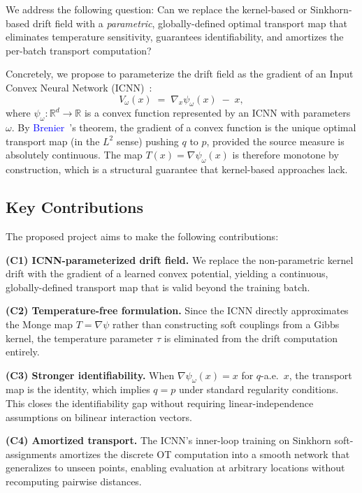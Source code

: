 \documentclass[10pt,conference,compsocconf]{IEEEtran}
\newcommand{\citet}[2]{\textcolor{blue}{#1}~\cite{#2}}
\newcommand{\R}{\mathbb{R}}
\begin{document}
We address the following question: Can we replace the kernel-based or Sinkhorn-based drift field with a \emph{parametric}, globally-defined optimal transport map that eliminates temperature sensitivity, guarantees identifiability, and amortizes the per-batch transport computation? 

Concretely, we propose to parameterize the drift field as the gradient of an Input Convex Neural Network (ICNN)~\cite{amos2017input}:
\begin{equation}\label{eq:icnn_drift}
  V_\omega(x) \;=\; \nabla_x \psi_\omega(x) \;-\; x,
\end{equation}
where $\psi_\omega : \R^d \to \R$ is a convex function represented by an ICNN with parameters $\omega$.
By \citet{Brenier}{brenier1991polar}'s theorem, the gradient of a convex function is the unique optimal transport map (in the $L^2$ sense) pushing $q$ to $p$, provided the source measure is absolutely continuous.
The map $T(x) = \nabla\psi_\omega(x)$ is therefore monotone by construction, which is a structural guarantee that kernel-based approaches lack. 

\subsection{Key Contributions}

The proposed project aims to make the following contributions:

\textbf{(C1) ICNN-parameterized drift field.}
We replace the non-parametric kernel drift with the gradient of a learned convex potential, yielding a continuous, globally-defined transport map that is valid beyond the training batch. 

\textbf{(C2) Temperature-free formulation.}
Since the ICNN directly approximates the Monge map $T = \nabla\psi$ rather than constructing soft couplings from a Gibbs kernel, the temperature parameter $\tau$ is eliminated from the drift computation entirely. 

\textbf{(C3) Stronger identifiability.}
When $\nabla\psi_\omega(x) = x$ for $q$-a.e.\ $x$, the transport map is the identity, which implies $q = p$ under standard regularity conditions.
This closes the identifiability gap without requiring linear-independence assumptions on bilinear interaction vectors. 

\textbf{(C4) Amortized transport.}
The ICNN's inner-loop training on Sinkhorn soft-assignments amortizes the discrete OT computation into a smooth network that generalizes to unseen points, enabling evaluation at arbitrary locations without recomputing pairwise distances. 
\end{document}
